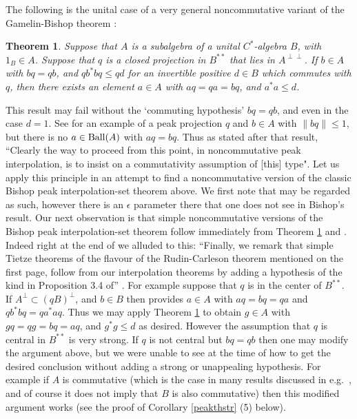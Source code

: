 \documentclass{amsart}
\newtheorem{theorem}{Theorem}[section]
\theoremstyle{remark}
\theoremstyle{definition}
\numberwithin{equation}{section}
\begin{document}
The following is the unital case of a very general noncommutative variant of the Gamelin-Bishop theorem \cite[Theorem 3.4]{Bnpi}:  

\begin{theorem} \label{peakthang22}    \cite{Bnpi}  Suppose that $A$ is a subalgebra of a unital $C^*$-algebra $B$, with $1_B \in A$.  Suppose
 that  $q$ is a closed projection in $B^{**}$ that lies in $A^{\perp \perp}$.
   If $b \in A$ with $b q= qb$,
 and $q b^* b q  \leq q d$ for an invertible positive $d \in B$ which commutes with $q$,
then  there exists an element $a \in A$ with $a q =  q a = b q$, and $a^* a \leq d$.
\end{theorem}

This result may fail without the `commuting hypothesis'  $b q= qb$, and even in the case $d = 1$.   See \cite[Corollary 2.4]{BRII} for an example of a peak projection $q$
and $b \in A$ with $\| b q \| \leq 1$, but there is no $a \in {\rm Ball}(A)$ with $aq = bq$.   Thus as stated after that result,  ``Clearly the way to proceed from this point, in noncommutative peak interpolation, is to insist on a commutativity assumption of [this] type".    Let us  apply this principle in an attempt to find a noncommutative version of the 
classic Bishop peak interpolation-set theorem above.   We first note that \cite[Propositions 3.2 and 3.4]{Hay} may be regarded as such, however there is an $\epsilon$ parameter there that one does not see in Bishop's result.
Our next observation is that simple noncommutative versions of the Bishop peak interpolation-set theorem  follow immediately from Theorem \ref{peakthang22}  and  \cite[Proposition 3.4]{Hay}.
Indeed right at the end of \cite{Bnpi} we alluded to this: ``Finally, we remark that simple Tietze theorems of the flavour of the Rudin-Carleson theorem mentioned on the first page, follow from our interpolation theorems by adding a hypothesis of the kind in Proposition 3.4 of'' \cite{Hay}. 
For example suppose that $q$ is in the center of $B^{**}$. 
 If $A^\perp \subset (q B)^\perp$, and $b \in B$  then  \cite[Proposition 3.4]{Hay} provides $a \in A$ with 
$aq = bq = q a$ and $q b^* b q = q a^* a q$.  Thus we may apply Theorem \ref{peakthang22}  to obtain  $g \in A$ with $g q =  q g = b q = aq$, and $g^* g \leq d$ as desired.  
However the assumption that $q$ is central in $B^{**}$ is very strong.   If $q$ is not central but $bq = qb$ then one may modify the argument above, but we were unable to see at the time of \cite{Bnpi} how to get the desired conclusion without adding a strong or  unappealing hypothesis.  For example if $A$ is commutative (which is the case in many results discussed in e.g.\ \cite{CD,CD2,DH}, and of course it does not imply that $B$ is also commutative) then this modified argument works (see the proof of Corollary \ref{peakthstr} (5) below). 
\end{document}

